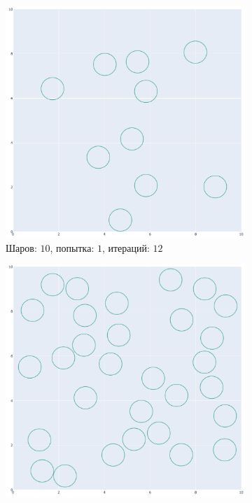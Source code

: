\begin{enumerate}
\begin{figure}[h!]
\begin{subfigure}{0.49\textwidth}
            \includegraphics [width=\imgsize,height=\imgsize]{figures/rand_pack/c10att1iter12totiter12.png}
            \caption{Шаров: $10$, попытка: $1$, итераций: $12$}
        \end{subfigure}
        \begin{subfigure}{0.49\textwidth}
            \centering
            \includegraphics [width=\imgsize,height=\imgsize]{figures/rand_pack/c30att1iter42totiter42.png}

\end{subfigure}
\end{figure}
\end{enumerate}
